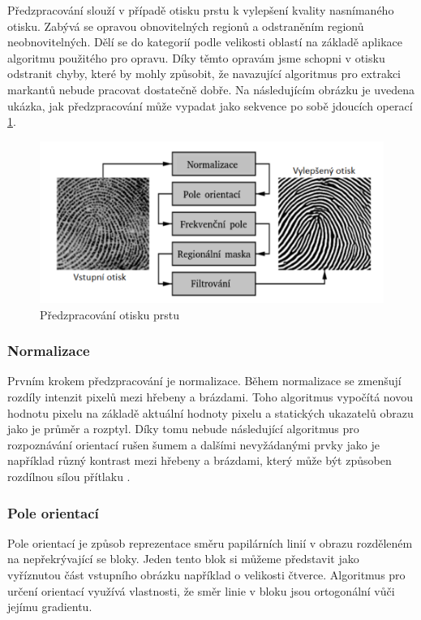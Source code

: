 Předzpracování slouží v případě otisku prstu k vylepšení kvality nasnímaného otisku. Zabývá se opravou obnovitelných regionů a odstraněním regionů neobnovitelných. Dělí se do kategorií podle velikosti oblastí na základě aplikace algoritmu použitého pro opravu. Díky těmto opravám jsme schopni v otisku odstranit chyby, které by mohly způsobit, že navazující algoritmus pro extrakci markantů nebude pracovat dostatečně dobře. Na následujícím obrázku je uvedena ukázka, jak předzpracování může vypadat jako sekvence po sobě jdoucích operací \ref{finger_preprocessing}.


\newpage
\begin{figure}[h]
	\centering
	\includegraphics[width=1\textwidth]{obrazky/preProcessing.png}
	\caption{Předzpracování otisku prstu \cite{otiskyPrstu}}
	\label{finger_preprocessing}
\end{figure}

\subsubsection{Normalizace}
Prvním krokem předzpracování je normalizace. Během normalizace se zmenšují rozdíly intenzit pixelů mezi hřebeny a brázdami. Toho algoritmus vypočítá novou hodnotu pixelu na základě aktuální hodnoty pixelu a statických ukazatelů obrazu jako je průměr a rozptyl. Díky tomu nebude následující algoritmus pro rozpoznávání orientací rušen šumem a dalšími nevyžádanými prvky jako je například různý kontrast mezi hřebeny a brázdami, který může být způsoben rozdílnou sílou přítlaku \cite{otiskyPrstu2}.

\subsubsection{Pole orientací}
Pole orientací je způsob reprezentace směru papilárních linií v obrazu rozděleném na nepřekrývající se bloky. Jeden tento blok si můžeme představit jako vyříznutou část vstupního obrázku například o velikosti čtverce. Algoritmus pro určení orientací využívá vlastnosti, že směr linie v bloku jsou ortogonální vůči jejímu gradientu.

